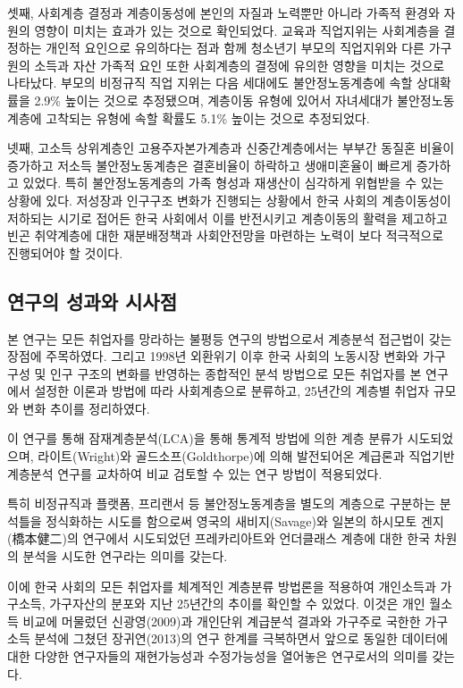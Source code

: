 \documentclass[
  letterpaper,
  DIV=11,
  numbers=noendperiod]{scrartcl}
\begin{document}
셋째, 사회계층 결정과 계층이동성에 본인의 자질과 노력뿐만 아니라 가족적
환경와 자원의 영향이 미치는 효과가 있는 것으로 확인되었다. 교육과
직업지위는 사회계층을 결정하는 개인적 요인으로 유의하다는 점과 함께
청소년기 부모의 직업지위와 다른 가구원의 소득과 자산 가족적 요인 또한
사회계층의 결정에 유의한 영향을 미치는 것으로 나타났다. 부모의 비정규직
직업 지위는 다음 세대에도 불안정노동계층에 속할 상대확률을 2.9\% 높이는
것으로 추정됐으며, 계층이동 유형에 있어서 자녀세대가 불안정노동계층에
고착되는 유형에 속할 확률도 5.1\% 높이는 것으로 추정되었다.

넷째, 고소득 상위계층인 고용주자본가계층과 신중간계층에서는 부부간
동질혼 비율이 증가하고 저소득 불안정노동계층은 결혼비율이 하락하고
생애미혼율이 빠르게 증가하고 있었다. 특히 불안정노동계층의 가족 형성과
재생산이 심각하게 위협받을 수 있는 상황에 있다. 저성장과 인구구조 변화가
진행되는 상황에서 한국 사회의 계층이동성이 저하되는 시기로 접어든 한국
사회에서 이를 반전시키고 계층이동의 활력을 제고하고 빈곤 취약계층에 대한
재분배정책과 사회안전망을 마련하는 노력이 보다 적극적으로 진행되어야 할
것이다.

\subsection{연구의 성과와
시사점}\label{uxc5f0uxad6cuxc758-uxc131uxacfcuxc640-uxc2dcuxc0acuxc810}

본 연구는 모든 취업자를 망라하는 불평등 연구의 방법으로서 계층분석
접근법이 갖는 장점에 주목하였다. 그리고 1998년 외환위기 이후 한국 사회의
노동시장 변화와 가구 구성 및 인구 구조의 변화를 반영하는 종합적인 분석
방법으로 모든 취업자를 본 연구에서 설정한 이론과 방법에 따라
사회계층으로 분류하고, 25년간의 계층별 취업자 규모와 변화 추이를
정리하였다.

이 연구를 통해 잠재계층분석(LCA)을 통해 통계적 방법에 의한 계층 분류가
시도되었으며, 라이트(Wright)와 골드소프(Goldthorpe)에 의해 발전되어온
계급론과 직업기반 계층분석 연구를 교차하여 비교 검토할 수 있는 연구
방법이 적용되었다.

특히 비정규직과 플랫폼, 프리랜서 등 불안정노동계층을 별도의 계층으로
구분하는 분석틀을 정식화하는 시도를 함으로써 영국의 새비지(Savage)와
일본의 하시모토 겐지(橋本健二)의 연구에서 시도되었던 프레카리아트와
언더클래스 계층에 대한 한국 차원의 분석을 시도한 연구라는 의미를 갖는다.

이에 한국 사회의 모든 취업자를 체계적인 계층분류 방법론을 적용하여
개인소득과 가구소득, 가구자산의 분포와 지난 25년간의 추이를 확인할 수
있었다. 이것은 개인 월소득 비교에 머물렀던 신광영(2009)과 개인단위
계급분석 결과와 가구주로 국한한 가구소득 분석에 그쳤던 장귀연(2013)의
연구 한계를 극복하면서 앞으로 동일한 데이터에 대한 다양한 연구자들의
재현가능성과 수정가능성을 열어놓은 연구로서의 의미를 갖는다.
\end{document}
